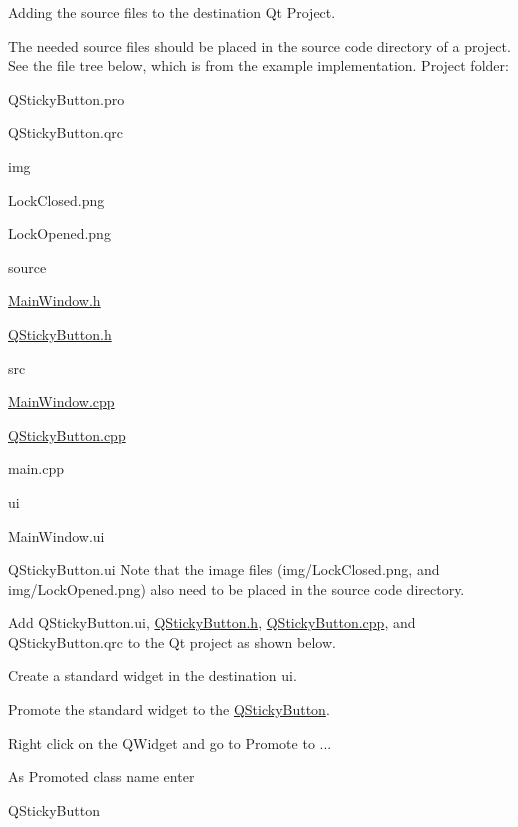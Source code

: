 \begin{DoxyEnumerate}
\item Adding the source files to the destination Qt Project.
\begin{DoxyItemize}
\item The needed source files should be placed in the source code directory of a project. See the file tree below, which is from the example implementation. Project folder\-:
\begin{DoxyItemize}
\item Q\-Sticky\-Button.\-pro
\item Q\-Sticky\-Button.\-qrc
\item img
\begin{DoxyItemize}
\item Lock\-Closed.\-png
\item Lock\-Opened.\-png
\end{DoxyItemize}
\item source
\begin{DoxyItemize}
\item \hyperlink{_main_window_8h}{Main\-Window.\-h}
\item \hyperlink{_q_sticky_button_8h}{Q\-Sticky\-Button.\-h}
\item src
\begin{DoxyItemize}
\item \hyperlink{_main_window_8cpp}{Main\-Window.\-cpp}
\item \hyperlink{_q_sticky_button_8cpp}{Q\-Sticky\-Button.\-cpp}
\item main.\-cpp
\end{DoxyItemize}
\end{DoxyItemize}
\item ui
\begin{DoxyItemize}
\item Main\-Window.\-ui
\item Q\-Sticky\-Button.\-ui Note that the image files ({\ttfamily img/\-Lock\-Closed.\-png}, and {\ttfamily img/\-Lock\-Opened.\-png}) also need to be placed in the source code directory.
\end{DoxyItemize}
\end{DoxyItemize}
\item Add {\ttfamily Q\-Sticky\-Button.\-ui}, \hyperlink{_q_sticky_button_8h}{Q\-Sticky\-Button.\-h}, \hyperlink{_q_sticky_button_8cpp}{Q\-Sticky\-Button.\-cpp}, and {\ttfamily Q\-Sticky\-Button.\-qrc} to the Qt project as shown below. 
\end{DoxyItemize}
\item Create a standard widget in the destination {\ttfamily ui}.
\item Promote the standard widget to the \hyperlink{class_q_sticky_button}{Q\-Sticky\-Button}.
\begin{DoxyItemize}
\item Right click on the {\ttfamily Q\-Widget} and go to {\ttfamily Promote to ...}
\item As {\ttfamily Promoted class name} enter\begin{DoxyVerb}QStickyButton \end{DoxyVerb}


\end{DoxyItemize}
\end{DoxyEnumerate}
